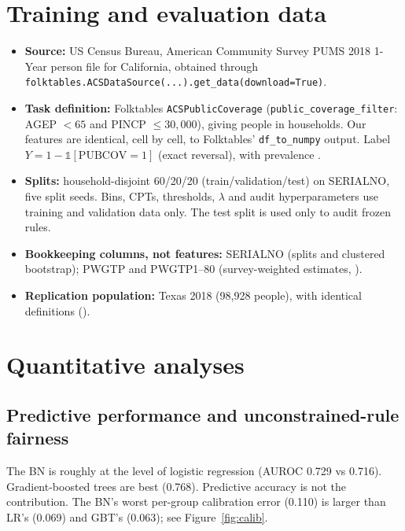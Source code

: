 \documentclass[10pt]{article}
\begin{document}
\section{Training and evaluation data}
\begin{itemize}
  \item \textbf{Source:} US Census Bureau, American Community Survey PUMS 2018 1-Year person file for California, obtained through
    \texttt{folktables.ACSDataSource(...).get\_data(download=True)}.
  \item \textbf{Task definition:} Folktables \texttt{ACSPublicCoverage} (\texttt{public\_coverage\_filter}: AGEP $<65$ and
    PINCP $\le30{,}000$), giving \Nall{} people in \Nhh{} households. Our features are identical, cell by cell, to
    Folktables' \texttt{df\_to\_numpy} output. Label $Y=1-\mathbb 1[\text{PUBCOV}=1]$ (exact reversal), with prevalence \prev{}.
  \item \textbf{Splits:} household-disjoint 60/20/20 (train/validation/test) on SERIALNO, five split seeds. Bins, CPTs,
    thresholds, $\lambda$ and audit hyperparameters use training and validation data only. The test split is used only to
    audit frozen rules.
  \item \textbf{Bookkeeping columns, not features:} SERIALNO (splits and clustered bootstrap); PWGTP and PWGTP1--80
    (survey-weighted estimates, ).
  \item \textbf{Replication population:} Texas 2018 (98,928 people), with identical definitions ().
\end{itemize}

\section{Quantitative analyses}
\subsection{Predictive performance and unconstrained-rule fairness}
\begin{table}[h]\centering\small
\caption{Test metrics of the unconstrained top-\capacity{} rule, mean $\pm$ sd over 5 household splits.}\label{tab:pred}

\end{table}

The BN is roughly at the level of logistic regression (AUROC 0.729 vs 0.716). Gradient-boosted trees are best (0.768).
Predictive accuracy is not the contribution. The BN's worst per-group calibration error (0.110) is larger than LR's
(0.069) and GBT's (0.063); see Figure~\ref{fig:calib}.
\end{document}
